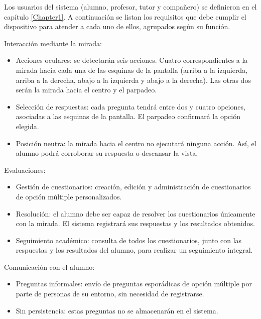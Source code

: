 Los usuarios del sistema (alumno, profesor, tutor y compañero) se definieron en el capítulo \ref{Chapter1}. A continuación se listan los requisitos que debe cumplir el dispositivo para atender a cada uno de ellos, agrupados según su función.

Interacción mediante la mirada:

\begin{itemize}

\item Acciones oculares: se detectarán seis acciones. Cuatro correspondientes a la mirada hacia cada una de las esquinas de la pantalla (arriba a la izquierda, arriba a la derecha, abajo a la izquierda y abajo a la derecha). Las otras dos serán la mirada hacia el centro y el parpadeo.

\item Selección de respuestas: cada pregunta tendrá entre dos y cuatro opciones, asociadas a las esquinas de la pantalla. El parpadeo confirmará la opción elegida.

\item Posición neutra: la mirada hacia el centro no ejecutará ninguna acción. Así, el alumno podrá corroborar su respuesta o descansar la vista.

\end{itemize}

Evaluaciones:

\begin{itemize}

\item Gestión de cuestionarios: creación, edición y administración de cuestionarios de opción múltiple personalizados.

\item Resolución: el alumno debe ser capaz de resolver los cuestionarios únicamente con la mirada. El sistema registrará sus respuestas y los resultados obtenidos.

\item Seguimiento académico: consulta de todos los cuestionarios, junto con las respuestas y los resultados del alumno, para realizar un seguimiento integral.

\end{itemize}


Comunicación con el alumno:

\begin{itemize}

\item Preguntas informales: envío de preguntas esporádicas de opción múltiple por parte de personas de su entorno, sin necesidad de registrarse.

\item Sin persistencia: estas preguntas no se almacenarán en el sistema.

\end{itemize}

